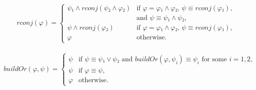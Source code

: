 \documentclass[../main.tex]{subfiles}
\begin{document}
\begin{equation}
\label{eq:rconj-def}
\begin{split}
&rconj(φ) =\begin{cases}
ψ₁ ∧ rconj(ψ₂ ∧ φ₂) &\text{if }φ = φ₁ ∧ φ₂\text{, } ψ≡rconj(φ₁),\\
&\text{and }ψ ≡ ψ₁ ∧ ψ₂,\\[3mm]
ψ ∧ rconj(φ₂)  &\text{if }φ = φ₁ ∧ φ₂\text{, } ψ≡rconj(φ₁),\\
φ &\text{otherwise.}
\end{cases}
\end{split}
\end{equation}

\begin{equation}
\begin{split}
\label{eq:buildOr}
buildOr(φ, ψ) =
\begin{cases}
ψ &\text{if } ψ ≡ ψ₁ ∨ ψ₂\text{ and } buildOr(φ, ψ_{i}) ≡ ψ_{i}\text{ for some }i=1, 2,\\
ψ &\text{if } φ ≡ ψ,\\
φ &\text{otherwise.}
\end{cases}
\end{split}
\end{equation}
\end{document}
